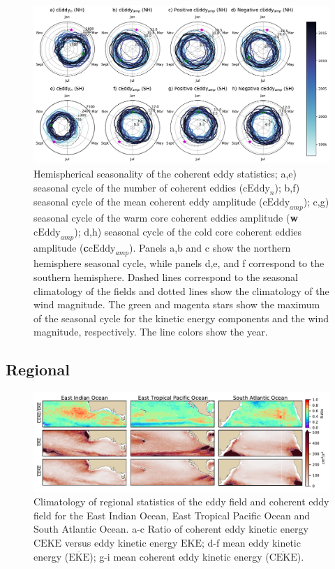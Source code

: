 \documentclass[draft]{agujournal2019}
\newcommand{\MEKE}{\overline{\textrm{EKE}}}
\newcommand{\EKE}{\textrm{EKE}}
\newcommand{\MCEKE}{\overline{\textrm{CEKE}}}
\newcommand{\CEKE}{\textrm{CEKE}}
\newcommand{\cEddy}{\textrm{cEddy}}
\begin{document}
	\begin{figure}
	    \centering
	    \includegraphics[width=1\textwidth]{figures/All_polar_plots_eddy_stats_polarity.pdf}
	    \caption{Hemispherical seasonality of the coherent eddy statistics;
		a,e) seasonal cycle of the number of coherent eddies ($\cEddy_n$); b,f) seasonal cycle of the mean coherent eddy amplitude ($\cEddy_{amp}$); c,g) seasonal cycle of the warm core coherent eddies amplitude (\textbf{w$\cEddy_{amp}$}); d,h) seasonal cycle of the cold core coherent eddies amplitude (\textbf{c$\cEddy_{amp}$}). Panels a,b and c show the northern hemisphere seasonal cycle, while panels d,e, and f correspond to the southern hemisphere. Dashed lines correspond to the seasonal climatology of the fields and dotted lines show the climatology of the wind magnitude. The green and magenta stars show the maximum of the seasonal cycle for the kinetic energy components and the wind magnitude, respectively. The line colors show the year.}
	    \label{fig:my_label}
	\end{figure}


	\subsection{Regional}
	
	\begin{figure}
	    \centering
	    \includegraphics[width=1\textwidth]{figures/regional_eke_ceke_stats_no_stats.pdf}
	    \caption{Climatology of regional statistics of the eddy field and coherent eddy field for the East Indian Ocean, East Tropical Pacific Ocean and South Atlantic Ocean. a-c Ratio of coherent eddy kinetic energy $\CEKE$ versus eddy kinetic energy $\EKE$; d-f  mean eddy kinetic energy ($\MEKE$); g-i mean coherent eddy kinetic energy ($\MCEKE$).}
	    \label{fig:my_label}
	\end{figure}
\end{document}
